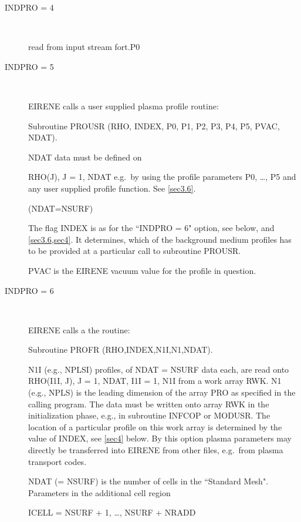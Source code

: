 \begin{description}
\begin{description}
          \item[INDPRO = 4] ~ 

                read from input stream fort.P0 

          \item[INDPRO = 5] ~ 

                EIRENE calls a user supplied plasma profile routine:

                Subroutine PROUSR (RHO, INDEX, P0, P1, P2, P3, P4, P5, PVAC, NDAT).

                NDAT data must be defined on 

                RHO(J), J = 1, NDAT e.g.\ by using the profile parameters P0, \dots, P5 and any
                user supplied profile function.
                See \cref{sec3.6}.

                (NDAT=NSURF) 

                The flag INDEX is as for the ``INDPRO = 6" option, see below, and
                \cref{sec3.6,sec4}.
                It determines, which of the background medium profiles has to be provided at a
                particular call to subroutine PROUSR.

                PVAC is the EIRENE vacuum value for the profile in question.
          \item[INDPRO = 6] ~ 

                EIRENE calls a the routine:

                Subroutine PROFR (RHO,INDEX,N1I,N1,NDAT).

                N1I (e.g., NPLSI) profiles, of NDAT = NSURF data each, are read onto RHO(I1I,
                J), J = 1, NDAT, I1I = 1, N1I from a work array RWK.
                N1 (e.g., NPLS) is the leading dimension of the array PRO as specified in the
                calling program.
                The data must be written onto array RWK in the initialization phase, e.g., in
                subroutine INFCOP or MODUSR.
                The location of a particular profile on this work array is determined by the
                value of INDEX, see \cref{sec4} below.
                By this option plasma parameters may directly be transferred into EIRENE from
                other files, e.g.\ from plasma transport codes.

                NDAT (= NSURF) is the number of cells in the ``Standard Mesh".
                Parameters in the additional cell region 

                ICELL = NSURF + 1, \dots, NSURF + NRADD 


\end{description}
\end{description}
